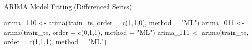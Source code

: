 \documentclass[
  11pt,
]{article}
\makeatletter
\let\oldparagraph\paragraph
\renewcommand{\paragraph}{
    \@ifstar
      \xxxParagraphStar
      \xxxParagraphNoStar
  }
\newcommand{\xxxParagraphStar}[1]{\oldparagraph*{#1}\mbox{}}
\newcommand{\xxxParagraphNoStar}[1]{\oldparagraph{#1}\mbox{}}
\newenvironment{Shaded}{\begin{snugshade}}{\end{snugshade}}
\newcommand{\AttributeTok}[1]{\textcolor[rgb]{0.40,0.45,0.13}{#1}}
\newcommand{\DecValTok}[1]{\textcolor[rgb]{0.68,0.00,0.00}{#1}}
\newcommand{\FunctionTok}[1]{\textcolor[rgb]{0.28,0.35,0.67}{#1}}
\newcommand{\NormalTok}[1]{\textcolor[rgb]{0.00,0.23,0.31}{#1}}
\newcommand{\OtherTok}[1]{\textcolor[rgb]{0.00,0.23,0.31}{#1}}
\newcommand{\StringTok}[1]{\textcolor[rgb]{0.13,0.47,0.30}{#1}}
\makeatother
\begin{document}
\paragraph{ARIMA Model Fitting (Differenced
Series)}\label{arima-model-fitting-differenced-series}

\begin{Shaded}
\begin{Highlighting}[]
\NormalTok{arima\_110 }\OtherTok{\textless{}{-}} \FunctionTok{arima}\NormalTok{(train\_ts, }\AttributeTok{order =} \FunctionTok{c}\NormalTok{(}\DecValTok{1}\NormalTok{,}\DecValTok{1}\NormalTok{,}\DecValTok{0}\NormalTok{), }\AttributeTok{method =} \StringTok{"ML"}\NormalTok{)}
\NormalTok{arima\_011 }\OtherTok{\textless{}{-}} \FunctionTok{arima}\NormalTok{(train\_ts, }\AttributeTok{order =} \FunctionTok{c}\NormalTok{(}\DecValTok{0}\NormalTok{,}\DecValTok{1}\NormalTok{,}\DecValTok{1}\NormalTok{), }\AttributeTok{method =} \StringTok{"ML"}\NormalTok{)}
\NormalTok{arima\_111 }\OtherTok{\textless{}{-}} \FunctionTok{arima}\NormalTok{(train\_ts, }\AttributeTok{order =} \FunctionTok{c}\NormalTok{(}\DecValTok{1}\NormalTok{,}\DecValTok{1}\NormalTok{,}\DecValTok{1}\NormalTok{), }\AttributeTok{method =} \StringTok{"ML"}\NormalTok{)}
\end{Highlighting}
\end{Shaded}
\end{document}
